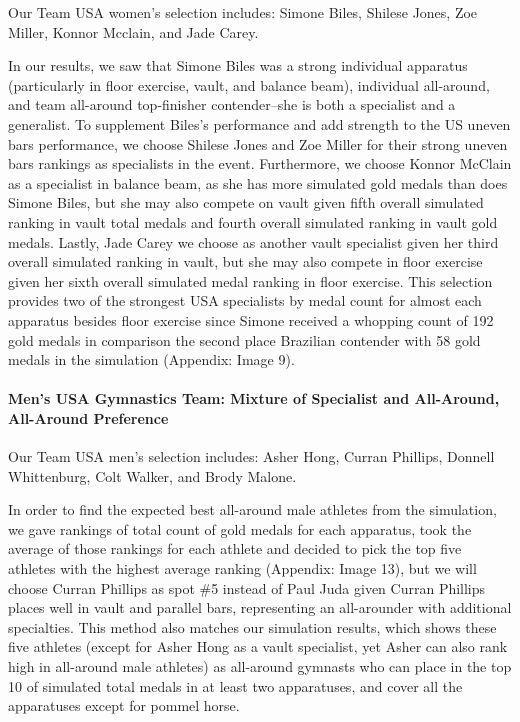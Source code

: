 \documentclass[
  10.5pt,
  letterpaper,
  DIV=11,
  numbers=noendperiod]{scrartcl}
\let\oldparagraph\paragraph
\renewcommand{\paragraph}[1]{\oldparagraph{#1}\mbox{}}
\begin{document}
Our Team USA women's selection includes: Simone Biles, Shilese Jones,
Zoe Miller, Konnor Mcclain, and Jade Carey.

In our results, we saw that Simone Biles was a strong individual
apparatus (particularly in floor exercise, vault, and balance beam),
individual all-around, and team all-around top-finisher contender--she
is both a specialist and a generalist. To supplement Biles's performance
and add strength to the US uneven bars performance, we choose Shilese
Jones and Zoe Miller for their strong uneven bars rankings as
specialists in the event. Furthermore, we choose Konnor McClain as a
specialist in balance beam, as she has more simulated gold medals than
does Simone Biles, but she may also compete on vault given fifth overall
simulated ranking in vault total medals and fourth overall simulated
ranking in vault gold medals. Lastly, Jade Carey we choose as another
vault specialist given her third overall simulated ranking in vault, but
she may also compete in floor exercise given her sixth overall simulated
medal ranking in floor exercise. This selection provides two of the
strongest USA specialists by medal count for almost each apparatus
besides floor exercise since Simone received a whopping count of 192
gold medals in comparison the second place Brazilian contender with 58
gold medals in the simulation (Appendix: Image 9).

\hypertarget{mens-usa-gymnastics-team-mixture-of-specialist-and-all-around-all-around-preference}{%
\paragraph{Men's USA Gymnastics Team: Mixture of Specialist and
All-Around, All-Around
Preference}\label{mens-usa-gymnastics-team-mixture-of-specialist-and-all-around-all-around-preference}}

Our Team USA men's selection includes: Asher Hong, Curran Phillips,
Donnell Whittenburg, Colt Walker, and Brody Malone.

In order to find the expected best all-around male athletes from the
simulation, we gave rankings of total count of gold medals for each
apparatus, took the average of those rankings for each athlete and
decided to pick the top five athletes with the highest average ranking
(Appendix: Image 13), but we will choose Curran Phillips as spot \#5
instead of Paul Juda given Curran Phillips places well in vault and
parallel bars, representing an all-arounder with additional specialties.
This method also matches our simulation results, which shows these five
athletes (except for Asher Hong as a vault specialist, yet Asher can
also rank high in all-around male athletes) as all-around gymnasts who
can place in the top 10 of simulated total medals in at least two
apparatuses, and cover all the apparatuses except for pommel horse.
\end{document}
